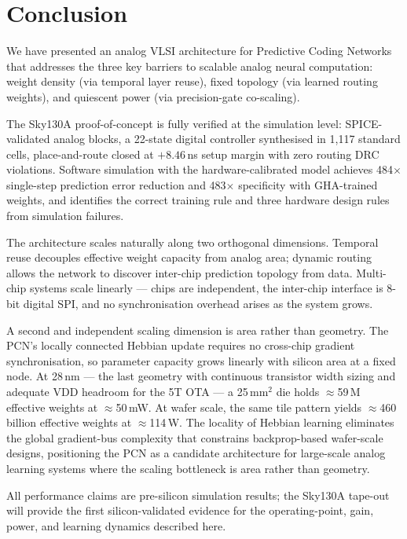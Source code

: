 \documentclass[journal,10pt,twoside]{IEEEtran}
\begin{document}
\section{Conclusion}
\label{sec:conclusion}

We have presented an analog VLSI architecture for Predictive Coding Networks
that addresses the three key barriers to scalable analog neural computation:
weight density (via temporal layer reuse), fixed topology (via learned
routing weights), and quiescent power (via precision-gate co-scaling).

The Sky130A proof-of-concept is fully verified at the simulation level:
SPICE-validated analog blocks, a 22-state digital controller synthesised in
1,117 standard cells, place-and-route closed at $+8.46$\,ns setup margin
with zero routing DRC violations.
Software simulation with the hardware-calibrated model achieves
484$\times$ single-step prediction error reduction and 483$\times$
specificity with GHA-trained weights, and identifies the correct training
rule and three hardware design rules from simulation failures.

The architecture scales naturally along two orthogonal dimensions.
Temporal reuse decouples effective weight capacity from analog area;
dynamic routing allows the network to discover inter-chip prediction
topology from data.
Multi-chip systems scale linearly — chips are independent, the inter-chip
interface is 8-bit digital SPI, and no synchronisation overhead arises
as the system grows.

A second and independent scaling dimension is area rather than geometry.
The PCN's locally connected Hebbian update requires no cross-chip gradient
synchronisation, so parameter capacity grows linearly with silicon area
at a fixed node.
At 28\,nm — the last geometry with continuous transistor width sizing and
adequate VDD headroom for the 5T OTA — a 25\,mm$^2$ die holds
$\approx$59\,M effective weights at $\approx$50\,mW.
At wafer scale, the same tile pattern yields $\approx$460 billion effective
weights at $\approx$114\,W.
The locality of Hebbian learning eliminates the global gradient-bus
complexity that constrains backprop-based wafer-scale designs, positioning
the PCN as a candidate architecture for large-scale analog learning systems
where the scaling bottleneck is area rather than geometry.

All performance claims are pre-silicon simulation results; the Sky130A
tape-out will provide the first silicon-validated evidence for the
operating-point, gain, power, and learning dynamics described here.
\end{document}
